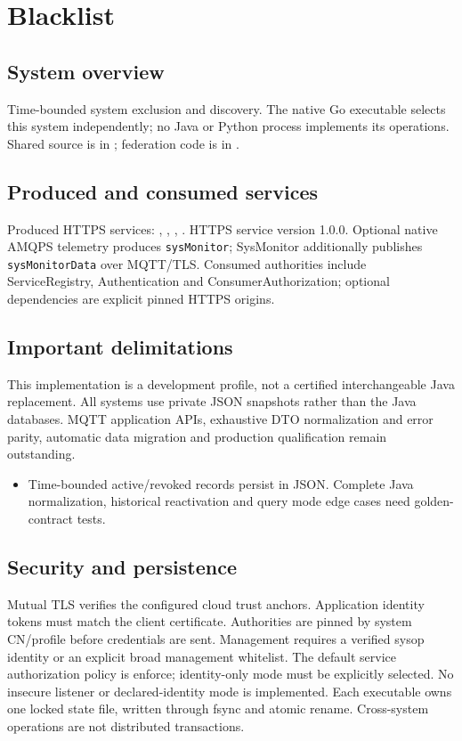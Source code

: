 \documentclass[a4paper]{arrowhead}
\begin{document}
\ArrowheadSetup
\section{Blacklist}
\subsection{System overview}
Time-bounded system exclusion and discovery. The native Go executable selects this system independently; no Java or Python process implements its operations. Shared source is in ; federation code is in .
\subsection{Produced and consumed services}
Produced HTTPS services: , \allowbreak {}, \allowbreak {}, \allowbreak {}.
HTTPS service version 1.0.0. Optional native AMQPS telemetry produces \texttt{sysMonitor}; SysMonitor additionally publishes \texttt{sysMonitorData} over MQTT/TLS. Consumed authorities include ServiceRegistry, Authentication and ConsumerAuthorization; optional dependencies are explicit pinned HTTPS origins.
\subsection{Important delimitations}
This implementation is a development profile, not a certified interchangeable Java replacement. All systems use private JSON snapshots rather than the Java databases. MQTT application APIs, exhaustive DTO normalization and error parity, automatic data migration and production qualification remain outstanding.
\begin{itemize}
\item Time-bounded active/revoked records persist in JSON. Complete Java normalization, historical reactivation and query mode edge cases need golden-contract tests.
\end{itemize}
\subsection{Security and persistence}
Mutual TLS verifies the configured cloud trust anchors. Application identity tokens must match the client certificate. Authorities are pinned by system CN/profile before credentials are sent. Management requires a verified sysop identity or an explicit broad management whitelist. The default service authorization policy is enforce; identity-only mode must be explicitly selected. No insecure listener or declared-identity mode is implemented. Each executable owns one locked state file, written through fsync and atomic rename. Cross-system operations are not distributed transactions.
\end{document}
